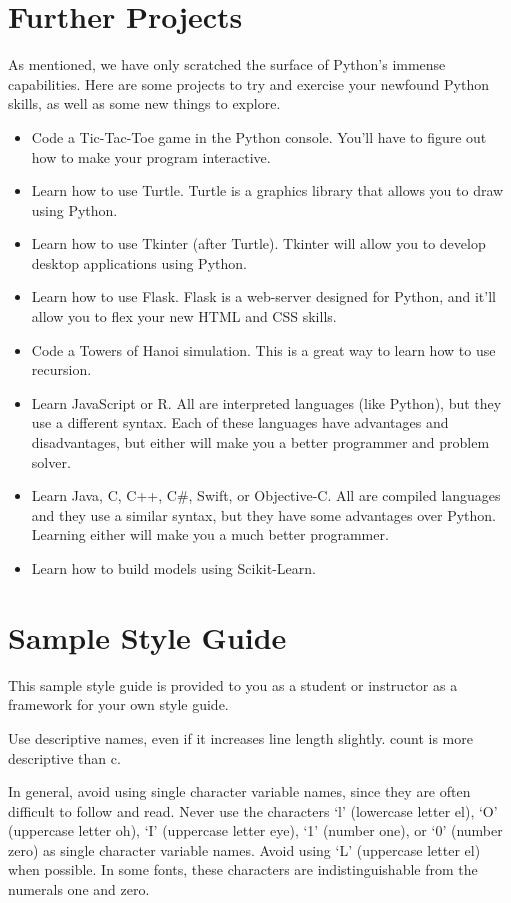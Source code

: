 \section*{Further Projects}
As mentioned, we have only scratched the surface of Python's immense capabilities. Here are some projects to try and exercise your newfound Python skills, as well as some new things to explore.
\begin{itemize}
    \item Code a Tic-Tac-Toe game in the Python console. You'll have to figure out how to make your program interactive.
    \item Learn how to use Turtle. Turtle is a graphics library that allows you to draw using Python.
    \item Learn how to use Tkinter (after Turtle). Tkinter will allow you to develop desktop applications using Python.
    \item Learn how to use Flask. Flask is a web-server designed for Python, and it'll allow you to flex your new HTML and CSS skills.
    \item Code a Towers of Hanoi simulation. This is a great way to learn how to use recursion.
    \item Learn JavaScript or R. All are interpreted languages (like Python), but they use a different syntax. Each of these languages have advantages and disadvantages, but either will make you a better programmer and problem solver.
    \item Learn Java, C, C++, C\#, Swift, or Objective-C. All are compiled languages and they use a similar syntax, but they have some advantages over Python. Learning either will make you a much better programmer.
    \item Learn how to build models using Scikit-Learn.
\end{itemize}
\section*{Sample Style Guide}
This sample style guide is provided to you as a student or instructor as a framework for your own style guide.

Use descriptive names, even if it increases line length slightly. count is more descriptive than c.

In general, avoid using single character variable names, since they are often difficult to follow and read. Never use the characters ‘l’ (lowercase letter el), ‘O’ (uppercase letter oh), ‘I’ (uppercase letter eye), ‘1’ (number one), or ‘0’ (number zero) as single character variable names. Avoid using ‘L’ (uppercase letter el) when possible. In some fonts, these characters are indistinguishable from the numerals one and zero.

